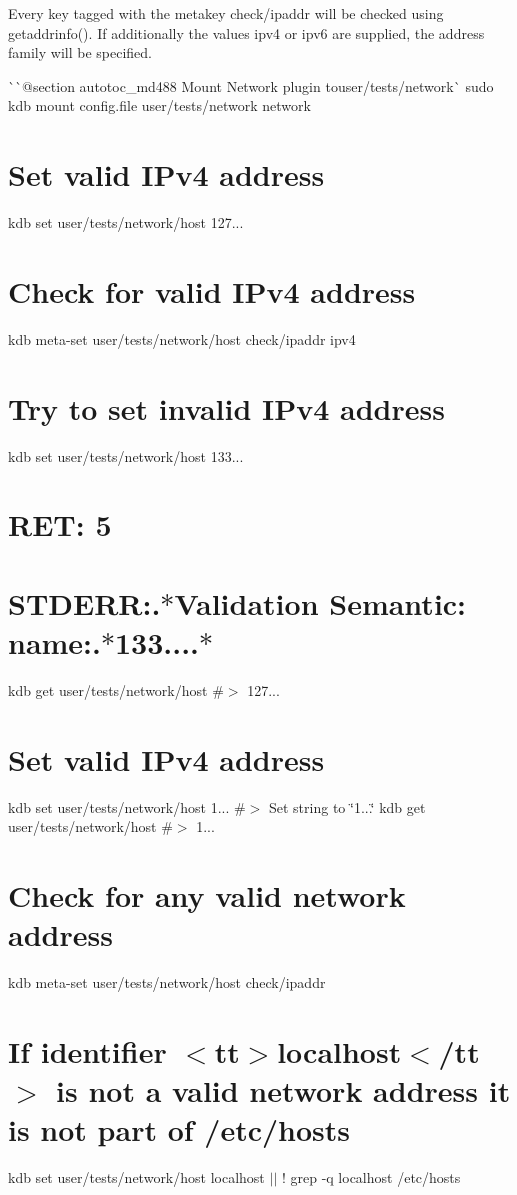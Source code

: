 Every key tagged with the metakey {\ttfamily check/ipaddr} will be checked using {\ttfamily getaddrinfo()}. If additionally the values {\ttfamily ipv4} or {\ttfamily ipv6} are supplied, the address family will be specified.

\`{}\`{}{\ttfamily  @section autotoc\+\_\+md488 Mount Network plugin to}user/tests/network\`{} sudo kdb mount config.\+file user/tests/network network\hypertarget{autotoc_md484_autotoc_md489}{}\section{Set valid I\+Pv4 address}\label{autotoc_md484_autotoc_md489}
kdb set user/tests/network/host 127... \hypertarget{autotoc_md484_autotoc_md490}{}\section{Check for valid I\+Pv4 address}\label{autotoc_md484_autotoc_md490}
kdb meta-\/set user/tests/network/host check/ipaddr ipv4\hypertarget{autotoc_md484_autotoc_md491}{}\section{Try to set invalid I\+Pv4 address}\label{autotoc_md484_autotoc_md491}
kdb set user/tests/network/host 133... \hypertarget{autotoc_md484_autotoc_md492}{}\section{R\+E\+T\+: 5}\label{autotoc_md484_autotoc_md492}
\hypertarget{autotoc_md484_autotoc_md493}{}\section{S\+T\+D\+E\+R\+R\+:.$\ast$\+Validation Semantic\+: name\+:.$\ast$133....$\ast$}\label{autotoc_md484_autotoc_md493}
kdb get user/tests/network/host \#$>$ 127...\hypertarget{autotoc_md484_autotoc_md494}{}\section{Set valid I\+Pv4 address}\label{autotoc_md484_autotoc_md494}
kdb set user/tests/network/host 1... \#$>$ Set string to \char`\"{}1...\char`\"{} kdb get user/tests/network/host \#$>$ 1...\hypertarget{autotoc_md484_autotoc_md495}{}\section{Check for any valid network address}\label{autotoc_md484_autotoc_md495}
kdb meta-\/set user/tests/network/host check/ipaddr \textquotesingle{}\textquotesingle{} \hypertarget{autotoc_md484_autotoc_md496}{}\section{If identifier $<$tt$>$localhost$<$/tt$>$ is not a valid network address it is not part of /etc/hosts}\label{autotoc_md484_autotoc_md496}
kdb set user/tests/network/host localhost $\vert$$\vert$ ! grep -\/q localhost /etc/hosts


